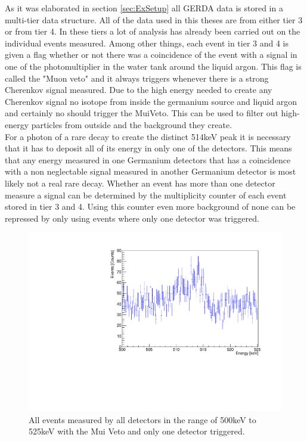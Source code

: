 As it was elaborated in section \ref{sec:ExSetup} all GERDA data is stored in a multi-tier data structure. 
All of the data used in this theses are from either tier 3 or from tier 4.
In these tiers a lot of analysis has already been carried out on the individual events measured. 
Among other things, each event in tier 3 and 4 is given a flag whether or not there was a coincidence of the event with a signal in one of the photomultiplier in the water tank around the liquid argon.
This flag is called the "Muon veto" and it always triggers whenever there is a strong Cherenkov signal measured.
Due to the high energy needed to create any Cherenkov signal no isotope from inside the germanium source and liquid argon and certainly no  should trigger the MuiVeto.
This can be used to filter out high-energy particles from outside and the background they create.
\\

For a photon of a rare  decay to create the distinct 514keV peak it is necessary that it has to deposit all of its energy in only one of the detectors. 
This means that any energy measured in one Germanium detectors that has a coincidence with a non neglectable signal measured in another Germanium detector is most likely not a real rare  decay.
Whether an event has more than one detector measure a signal can be determined by the multiplicity counter of each event stored in tier 3 and 4.
Using this counter even more background of none  can be repressed by only using events where only one detector was triggered.
\\

\begin{figure}[ht]
	\centering
	\ifmakefigures%
	\includegraphics[width=130mm]{./Bilder/500525NoFilterAllDetectors.pdf}
	\fi%
	\caption{\label{fig:leichtGefiltertes500525}
		All events measured by all detectors in the range of 500keV to 525keV with the Mui Veto and only one detector triggered.
	}
\end{figure}

